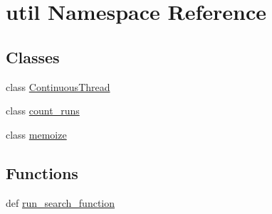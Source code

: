 \hypertarget{namespaceutil}{}\section{util Namespace Reference}
\label{namespaceutil}
\subsection*{Classes}
\begin{DoxyCompactItemize}
\item 
class \hyperlink{classutil_1_1_continuous_thread}{Continuous\+Thread}
\item 
class \hyperlink{classutil_1_1count__runs}{count\+\_\+runs}
\item 
class \hyperlink{classutil_1_1memoize}{memoize}
\end{DoxyCompactItemize}
\subsection*{Functions}
\begin{DoxyCompactItemize}
\item 
def \hyperlink{namespaceutil_ab8b35c47eb1a77e7a3f61851a1b46122}{run\+\_\+search\+\_\+function}
\end{DoxyCompactItemize}
